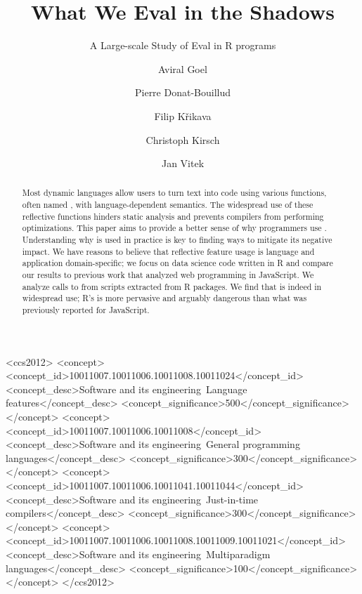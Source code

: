 \documentclass[acmsmall, screen]{acmart}
\begin{document}
\title{What We Eval in the Shadows}
\subtitle{A Large-scale Study of Eval in R programs}


\begin{CCSXML}
	<ccs2012>
	<concept>
	<concept_id>10011007.10011006.10011008.10011024</concept_id>
	<concept_desc>Software and its engineering~Language features</concept_desc>
	<concept_significance>500</concept_significance>
	</concept>
	<concept>
	<concept_id>10011007.10011006.10011008</concept_id>
	<concept_desc>Software and its engineering~General programming languages</concept_desc>
	<concept_significance>300</concept_significance>
	</concept>
	<concept>
	<concept_id>10011007.10011006.10011041.10011044</concept_id>
	<concept_desc>Software and its engineering~Just-in-time compilers</concept_desc>
	<concept_significance>300</concept_significance>
	</concept>
	<concept>
	<concept_id>10011007.10011006.10011008.10011009.10011021</concept_id>
	<concept_desc>Software and its engineering~Multiparadigm languages</concept_desc>
	<concept_significance>100</concept_significance>
	</concept>
	</ccs2012>
\end{CCSXML}



\author{Aviral Goel}
\author{Pierre Donat-Bouillud}
\author{Filip Křikava}
\author{Christoph Kirsch}
\author{Jan Vitek}

\begin{abstract}
  Most dynamic languages allow users to turn text into code using various
  functions, often named \eval, with language-dependent semantics. The
  widespread use of these reflective functions hinders static analysis and
  prevents compilers from performing optimizations. This paper aims to provide a
  better sense of why programmers use \eval. Understanding why \eval is used in
  practice is key to finding ways to mitigate its negative impact. We have
  reasons to believe that reflective feature usage is language and application
  domain-specific; we focus on data science code written in R and compare our
  results to previous work that analyzed web programming in JavaScript. We
  analyze \packageAllcalls calls to \eval from \CranRunnableScripts scripts
  extracted from \CranPackages R packages. We find that \eval is indeed in
  widespread use; R's \eval is more pervasive and arguably dangerous than what
  was previously reported for JavaScript.
\end{abstract}
\end{document}
